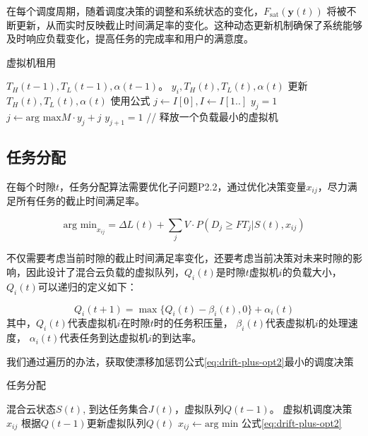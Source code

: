 在每个调度周期，随着调度决策的调整和系统状态的变化，\( F_{\text{sat}}(\mathbf{y}(t)) \) 将被不断更新，从而实时反映截止时间满足率的变化。这种动态更新机制确保了系统能够及时响应负载变化，提高任务的完成率和用户的满意度。

\begin{algorithm}[H]
    \caption{虚拟机租用}
    \label{alg:vm-rent}
    \begin{algorithmic}[1]
        \REQUIRE{} $T_H(t-1), T_L(t-1), \alpha(t-1)$。
        \ENSURE{} $y_i, T_H(t), T_L(t), \alpha(t)$
        \STATE{} 更新$T_H(t), T_L(t), \alpha(t)$ 使用公式
        \STATE{} $j \gets I[0], I \gets I[1..]$
        \STATE{} $y_{j} = 1$
        \ELSE
        \STATE{} $j \gets \text{arg max} M\cdot y_j + j$
        \STATE{} $y_{j+1} = 1$
        \ENDIF
        \ELSE {}
        \STATE{} // 释放一个负载最小的虚拟机
        \ENDIF
        \ENDIF
    \end{algorithmic}
\end{algorithm}

\subsection{任务分配}

在每个时隙$t$，任务分配算法需要优化子问题P2.2，通过优化决策变量$x_{ij}$，尽力满足所有任务的截止时间满足率。

\begin{equation}
    \text{arg min}_{x_{ij}} = \Delta L(t) + \sum_{j} V\cdot P(D_j \ge FT_j | S(t), x_{ij})
    \label{eq:drift-plus-opt2}
\end{equation}

不仅需要考虑当前时隙的截止时间满足率变化，还要考虑当前决策对未来时隙的影响，因此设计了混合云负载的虚拟队列，$Q_i(t)$是时隙$t$虚拟机$i$的负载大小，$Q_i(t)$可以递归的定义如下：

\begin{equation}
    Q_i(t+1) = \max\{Q_i(t) - \beta_i(t), 0\} + \alpha_i(t)
\end{equation}
其中，$Q_i(t)$代表虚拟机$i$在时隙$t$时的任务积压量，
$\beta_i(t)$代表虚拟机$i$的处理速度，
$\alpha_i(t)$代表任务到达虚拟机$i$的到达率。

我们通过遍历的办法，获取使漂移加惩罚公式\eqref{eq:drift-plus-opt2}最小的调度决策

\begin{algorithm}[H]
    \caption{任务分配}%
    \label{alg:task-offload}
    \begin{algorithmic}[1]
        \REQUIRE{} 混合云状态$S(t)$, 到达任务集合$J(t)$，虚拟队列$Q(t-1)$。
        \ENSURE{} 虚拟机调度决策 $x_{ij}$
        \STATE{} 根据$Q(t-1)$更新虚拟队列$Q(t)$
        \STATE{} $x_{ij} \gets \text{arg min} $ 公式\eqref{eq:drift-plus-opt2}
        \ENDFOR
    \end{algorithmic}
\end{algorithm}

